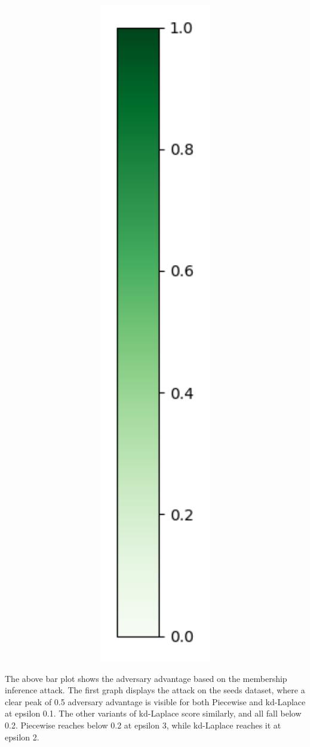 \begin{figure}[H]
\begin{subfigure}[b]{0.075\textwidth}
        \includegraphics[width=1\textwidth]{Results/kd-laplace/kd-Laplace/seeds-dataset/heatmap_legend.png}
    \end{subfigure}
\end{figure}
The above bar plot shows the adversary advantage based on the membership inference attack. The first graph displays the attack on the seeds dataset, where a clear peak of 0.5 adversary advantage is visible for both Piecewise and kd-Laplace at epsilon 0.1. The other variants of kd-Laplace score similarly, and all fall below 0.2. Piecewise reaches below 0.2 at epsilon 3, while kd-Laplace reaches it at epsilon 2.

